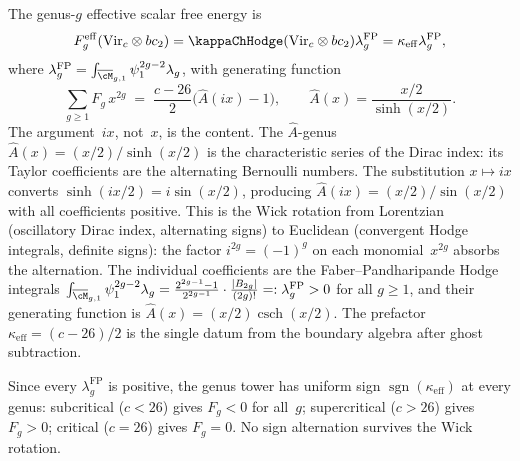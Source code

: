 The genus-$g$ effective scalar free energy is
\[
F_g^{\mathrm{eff}}(\mathrm{Vir}_c \otimes bc_2)
= \kappaChHodge(\mathrm{Vir}_c \otimes bc_2)
  \lambda_g^{\mathrm{FP}}
= \kappa_{\mathrm{eff}}\lambda_g^{\mathrm{FP}},
\]
where
$\lambda_g^{\mathrm{FP}}
=\int_{\overline{\cM}_{g,1}}\psi_1^{2g-2}\lambda_g$,
with generating function
\begin{equation}\label{eq:gravity-generating}
\sum_{g \ge 1} F_g\,x^{2g}
\;=\;
\frac{c - 26}{2}\bigl(\hat{A}(ix) - 1\bigr),
\qquad
\hat{A}(x) = \frac{x/2}{\sinh(x/2)}.
\end{equation}
The argument~$ix$, not~$x$, is the content.
The $\hat{A}$-genus
$\hat{A}(x) = (x/2)/\sinh(x/2)$
is the characteristic series of the Dirac index:
its Taylor coefficients are the alternating Bernoulli
numbers.
The substitution $x \mapsto ix$ converts
$\sinh(ix/2) = i\sin(x/2)$, producing
$\hat{A}(ix) = (x/2)/\sin(x/2)$
with all coefficients positive.
This is the Wick rotation
from Lorentzian (oscillatory Dirac index, alternating signs)
to Euclidean (convergent Hodge integrals, definite signs):
the factor $i^{2g} = (-1)^g$ on each monomial~$x^{2g}$
absorbs the alternation. The individual coefficients
are the Faber--Pandharipande Hodge integrals
$\int_{\overline{\cM}_{g,1}}\psi_1^{2g-2}\lambda_g
= \frac{2^{2g-1}-1}{2^{2g-1}} \cdot \frac{|B_{2g}|}{(2g)!}
=: \lambda_g^{\mathrm{FP}} > 0$
for all $g \ge 1$, and their generating function is
$\hat{A}(x) = (x/2)\operatorname{csch}(x/2)$.
The prefactor $\kappa_{\mathrm{eff}} = (c{-}26)/2$ is the
single datum from the boundary algebra after ghost
subtraction.\label{obs:genus-tower-wick-anomaly}%
%
%

Since every $\lambda_g^{\mathrm{FP}}$ is positive,
the genus tower has uniform sign
$\operatorname{sgn}(\kappa_{\mathrm{eff}})$
at every genus: subcritical ($c < 26$) gives
$F_g < 0$ for all~$g$;
supercritical ($c > 26$) gives $F_g > 0$;
critical ($c = 26$) gives $F_g = 0$.
No sign alternation survives the Wick rotation.


